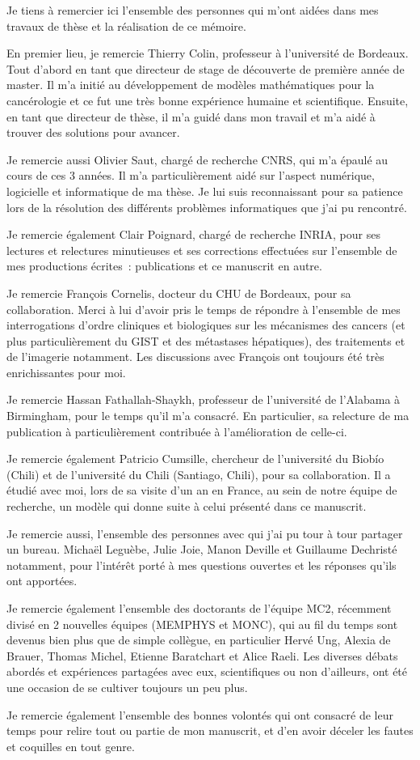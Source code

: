 Je tiens à remercier ici  l'ensemble des personnes qui m'ont aidées dans mes travaux de thèse et la réalisation de ce mémoire.

En premier lieu, je remercie Thierry Colin, professeur à l'université de Bordeaux. Tout d'abord en tant que directeur de stage de découverte de première année de master. Il m'a initié au développement de modèles mathématiques pour la cancérologie et ce fut une très bonne expérience humaine et scientifique. Ensuite, en tant que directeur de thèse, il m'a guidé dans mon travail et m'a aidé à trouver des solutions pour avancer. 

Je remercie aussi Olivier Saut, chargé de recherche CNRS, qui m'a épaulé au cours de ces 3 années. Il m'a particulièrement aidé sur l'aspect numérique, logicielle et informatique de ma thèse. Je lui suis reconnaissant pour sa patience lors de la résolution des différents problèmes informatiques que j'ai pu rencontré. 

Je remercie également Clair Poignard, chargé de recherche INRIA, pour ses lectures et relectures minutieuses et ses corrections effectuées sur l'ensemble de mes productions écrites~: publications et ce manuscrit en autre.

Je remercie François Cornelis, docteur du CHU de Bordeaux, pour sa collaboration. Merci à lui d'avoir pris le temps de répondre à l'ensemble de mes interrogations d'ordre cliniques et biologiques sur les mécanismes des cancers (et plus particulièrement du GIST et des métastases hépatiques), des traitements et de l'imagerie notamment. Les discussions avec François ont toujours été très enrichissantes pour moi. 

Je remercie Hassan Fathallah-Shaykh, professeur de l'université de l'Alabama à Birmingham, pour le temps qu'il m'a consacré. En particulier, sa relecture de ma publication à particulièrement contribuée à l'amélioration de celle-ci.

Je remercie également Patricio Cumsille, chercheur de l'université du Biobío (Chili) et de l'université du Chili (Santiago, Chili), pour sa collaboration. Il a étudié avec moi, lors de sa visite d'un an en France, au sein de notre équipe de recherche, un modèle qui donne suite à celui présenté dans ce manuscrit. 

Je remercie aussi, l'ensemble des personnes avec qui j'ai pu tour à tour partager un bureau. Michaël Leguèbe, Julie Joie, Manon Deville et Guillaume Dechristé notamment, pour l'intérêt porté à mes questions ouvertes et les réponses qu'ils ont apportées.

Je remercie également l'ensemble des doctorants de l'équipe MC2, récemment divisé en 2 nouvelles équipes (MEMPHYS et MONC), qui au fil du temps sont devenus bien plus que de simple collègue, en particulier Hervé Ung, Alexia de Brauer, Thomas Michel, Etienne Baratchart et Alice Raeli. Les diverses débats abordés et expériences partagées avec eux, scientifiques ou non d'ailleurs, ont été une occasion de se cultiver toujours un peu plus.

Je remercie également l'ensemble des bonnes volontés qui ont consacré de leur temps pour relire tout ou partie de mon manuscrit, et d'en avoir  déceler les fautes et coquilles en tout genre.